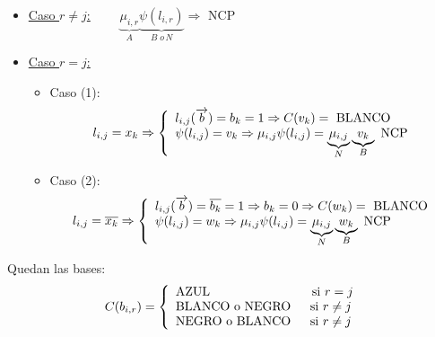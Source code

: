 \documentclass[12pt,a4paper]{report}
\newcounter{neq}
\begin{document}
				\begin{itemize}
					\item \underline{Caso $r \neq j$:} $\qquad \underbrace{\mu_{i, r}}_{A} \underbrace{\psi(l_{i, r})}_{B \; o \, N} \Rightarrow$ NCP
					\item \underline{Caso $r = j$:}
						\begin{itemize}
							\item Caso (1):
								\begin{equation*}
									l_{i, j} = x_{k} \Rightarrow
		  							\left\lbrace
									\begin{array}{l}
	  		 							l_{i, j}(\overrightarrow{b}) = b_{k} = 1 \Rightarrow C(v_{k}) = \textup{ BLANCO} \\
	  		 							\psi(l_{i, j}) = v_{k}	\Rightarrow \mu_{i, j} \psi(l_{i, j}) = \underbrace{\mu_{i, j}}_{N} \underbrace{v_{k}}_{B} \textup{ NCP}
									\end{array}
									\right.
								\end{equation*}

							\item Caso (2):
								\begin{equation*}
									l_{i, j} = \overline{x_{k}} \Rightarrow
		  							\left\lbrace
									\begin{array}{l}
	  		 							l_{i, j}(\overrightarrow{b}) = \overline{b_{k}} = 1 \Rightarrow b_{k} = 0 \Rightarrow C(w_{k}) = \textup{ BLANCO} \\
										\psi(l_{i, j}) = w_{k}	\Rightarrow \mu_{i, j} \psi(l_{i, j}) = \underbrace{\mu_{i, j}}_{N} \underbrace{w_{k}}_{B} \textup{ NCP}
									\end{array}
									\right.
								\end{equation*}
						\end{itemize}
				\end{itemize}

				\par Quedan las bases:
				\begin{equation*}
					C(b_{i, r}) =
				  \left\lbrace
		  		\begin{array}{l}
		    		\textup{AZUL \qquad \qquad\qquad \; \; \; si } r = j \\
		    		\textup{BLANCO o NEGRO \; \; si } r \neq j \\
		    		\textup{NEGRO o BLANCO \; \; si } r \neq j
		  		\end{array}
		 			\right.
				\end{equation*}
\end{document}
